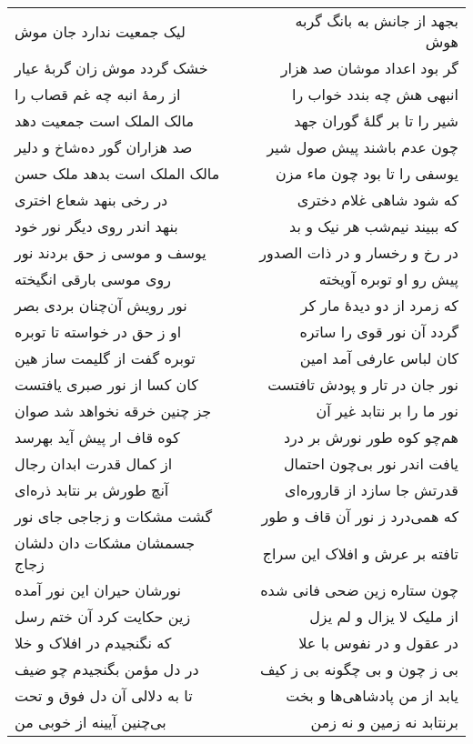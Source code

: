 \begin{center}
\begin{longtable}{l p{0.5cm} r}
\\
لیک جمعیت ندارد جان موش
&&
بجهد از جانش به بانگ گربه هوش
\\
خشک گردد موش زان گربهٔ عیار
&&
گر بود اعداد موشان صد هزار
\\
از رمهٔ انبه چه غم قصاب را
&&
انبهی هش چه بندد خواب را
\\
مالک الملک است جمعیت دهد
&&
شیر را تا بر گلهٔ گوران جهد
\\
صد هزاران گور ده‌شاخ و دلیر
&&
چون عدم باشند پیش صول شیر
\\
مالک الملک است بدهد ملک حسن
&&
یوسفی را تا بود چون ماء مزن
\\
در رخی بنهد شعاع اختری
&&
که شود شاهی غلام دختری
\\
بنهد اندر روی دیگر نور خود
&&
که ببیند نیم‌شب هر نیک و بد
\\
یوسف و موسی ز حق بردند نور
&&
در رخ و رخسار و در ذات الصدور
\\
روی موسی بارقی انگیخته
&&
پیش رو او توبره آویخته
\\
نور رویش آن‌چنان بردی بصر
&&
که زمرد از دو دیدهٔ مار کر
\\
او ز حق در خواسته تا توبره
&&
گردد آن نور قوی را ساتره
\\
توبره گفت از گلیمت ساز هین
&&
کان لباس عارفی آمد امین
\\
کان کسا از نور صبری یافتست
&&
نور جان در تار و پودش تافتست
\\
جز چنین خرقه نخواهد شد صوان
&&
نور ما را بر نتابد غیر آن
\\
کوه قاف ار پیش آید بهرسد
&&
هم‌چو کوه طور نورش بر درد
\\
از کمال قدرت ابدان رجال
&&
یافت اندر نور بی‌چون احتمال
\\
آنچ طورش بر نتابد ذره‌ای
&&
قدرتش جا سازد از قاروره‌ای
\\
گشت مشکات و زجاجی جای نور
&&
که همی‌درد ز نور آن قاف و طور
\\
جسمشان مشکات دان دلشان زجاج
&&
تافته بر عرش و افلاک این سراج
\\
نورشان حیران این نور آمده
&&
چون ستاره زین ضحی فانی شده
\\
زین حکایت کرد آن ختم رسل
&&
از ملیک لا یزال و لم یزل
\\
که نگنجیدم در افلاک و خلا
&&
در عقول و در نفوس با علا
\\
در دل مؤمن بگنجیدم چو ضیف
&&
بی ز چون و بی چگونه بی ز کیف
\\
تا به دلالی آن دل فوق و تحت
&&
یابد از من پادشاهی‌ها و بخت
\\
بی‌چنین آیینه از خوبی من
&&
برنتابد نه زمین و نه زمن
\\

\end{longtable}
\end{center}
